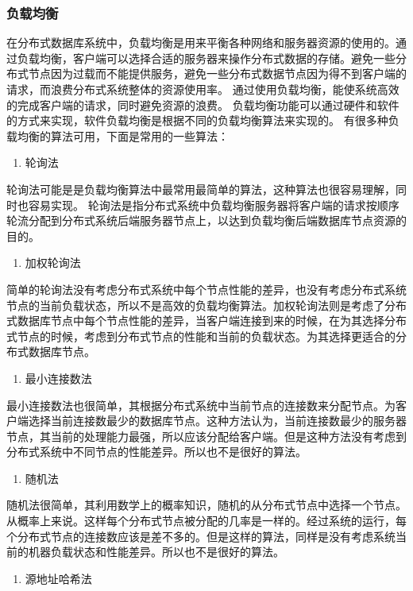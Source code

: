 \subsubsection{负载均衡}
在分布式数据库系统中，负载均衡是用来平衡各种网络和服务器资源的使用的。通过负载均衡，客户端可以选择合适的服务器来操作分布式数据的存储。避免一些分布式节点因为过载而不能提供服务，避免一些分布式数据节点因为得不到客户端的请求，而浪费分布式系统整体的资源使用率。
通过使用负载均衡，能使系统高效的完成客户端的请求，同时避免资源的浪费。
负载均衡功能可以通过硬件和软件的方式来实现，软件负载均衡是根据不同的负载均衡算法来实现的。
有很多种负载均衡的算法可用，下面是常用的一些算法：



	\begin{enumerate}
		\item 轮询法
	\end{enumerate}

	轮询法可能是是负载均衡算法中最常用最简单的算法，这种算法也很容易理解，同时也容易实现。 
	轮询法是指分布式系统中负载均衡服务器将客户端的请求按顺序
	轮流分配到分布式系统后端服务器节点上，以达到负载均衡后端数据库节点资源的目的。 	

\begin{enumerate}[resume]
	\item 加权轮询法
\end{enumerate}

	简单的轮询法没有考虑分布式系统中每个节点性能的差异，也没有考虑分布式系统节点的当前负载状态，所以不是高效的负载均衡算法。加权轮询法则是考虑了分布式数据库节点中每个节点性能的差异，当客户端连接到来的时候，在为其选择分布式节点的时候，考虑到分布式节点的性能和当前的负载状态。为其选择更适合的分布式数据库节点。

\begin{enumerate}[resume]
	\item 最小连接数法
\end{enumerate}

	最小连接数法也很简单，其根据分布式系统中当前节点的连接数来分配节点。为客户端选择当前连接数最少的数据库节点。这种方法认为，当前连接数最少的服务器节点，其当前的处理能力最强，所以应该分配给客户端。但是这种方法没有考虑到分布式系统中不同节点的性能差异。所以也不是很好的算法。

\begin{enumerate}[resume]
	\item 随机法
\end{enumerate}

	随机法很简单，其利用数学上的概率知识，随机的从分布式节点中选择一个节点。从概率上来说。这样每个分布式节点被分配的几率是一样的。经过系统的运行，每个分布式节点的连接数应该是差不多的。但是这样的算法，同样是没有考虑系统当前的机器负载状态和性能差异。所以也不是很好的算法。
\begin{enumerate}[resume]
	\item 源地址哈希法
\end{enumerate}

